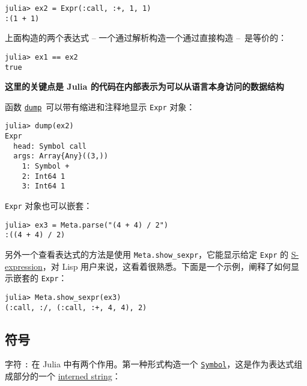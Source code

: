 \begin{verbatim}
julia> ex2 = Expr(:call, :+, 1, 1)
:(1 + 1)
\end{verbatim}



上面构造的两个表达式 – 一个通过解析构造一个通过直接构造 – 是等价的：




\begin{verbatim}
julia> ex1 == ex2
true
\end{verbatim}



\textbf{这里的关键点是 Julia 的代码在内部表示为可以从语言本身访问的数据结构}



函数 \hyperlink{15981569052160951906}{\texttt{dump}} 可以带有缩进和注释地显示 \texttt{Expr} 对象：




\begin{verbatim}
julia> dump(ex2)
Expr
  head: Symbol call
  args: Array{Any}((3,))
    1: Symbol +
    2: Int64 1
    3: Int64 1
\end{verbatim}



\texttt{Expr} 对象也可以嵌套：




\begin{verbatim}
julia> ex3 = Meta.parse("(4 + 4) / 2")
:((4 + 4) / 2)
\end{verbatim}



另外一个查看表达式的方法是使用 \texttt{Meta.show\_sexpr}，它能显示给定 \texttt{Expr} 的 \href{https://en.wikipedia.org/wiki/S-expression}{S-expression}，对 Lisp 用户来说，这看着很熟悉。下面是一个示例，阐释了如何显示嵌套的 \texttt{Expr}：




\begin{verbatim}
julia> Meta.show_sexpr(ex3)
(:call, :/, (:call, :+, 4, 4), 2)
\end{verbatim}



\hypertarget{17960433860062790097}{}


\subsection{符号}



字符 \texttt{:} 在 Julia 中有两个作用。第一种形式构造一个 \hyperlink{18332791376992528422}{\texttt{Symbol}}，这是作为表达式组成部分的一个 \href{https://en.wikipedia.org/wiki/String\_interning}{interned string}：




